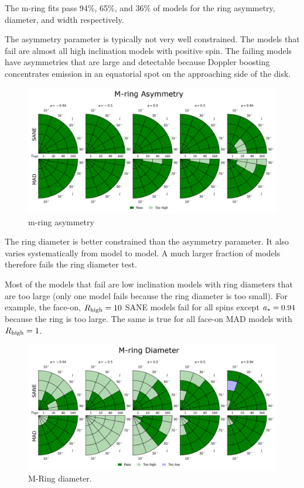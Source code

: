 \label{sec:mring}

The m-ring fits pass 94\%, 65\%, and 36\% of models for the ring asymmetry, diameter, and width respectively.

The asymmetry parameter is typically not very well constrained.  The models that fail are almost all high inclination models with positive spin.  The failing models have asymmetries that are large and detectable because Doppler boosting concentrates emission in an equatorial spot on the approaching side of the disk.

\begin{figure}
  \centering
  \includegraphics[width=\columnwidth]{./figures/Mring_f1_Constraints.png}
  \caption{m-ring asymmetry}
  \label{fig:cmp_m-ring_asymm}
\end{figure}

The ring diameter is better constrained than the asymmetry parameter.  It also varies systematically from model to model.  A much larger fraction of models therefore fails the ring diameter test.

Most of the models that fail are low inclination models with ring diameters that are too large (only one model fails because the ring diameter is too small).  For example, the face-on, $R_\mathrm{high} = 10$ SANE models fail for all spins except $a_* = 0.94$ because the ring is too large.  The same is true for all face-on MAD models with $R_\mathrm{high} = 1$.

\begin{figure}
  \centering
  \includegraphics[width=\columnwidth]{./figures/Mring_d_Constraints.png}
  \caption{M-Ring diameter.}
  \label{fig:cmp_m-ring_diam}
\end{figure}

